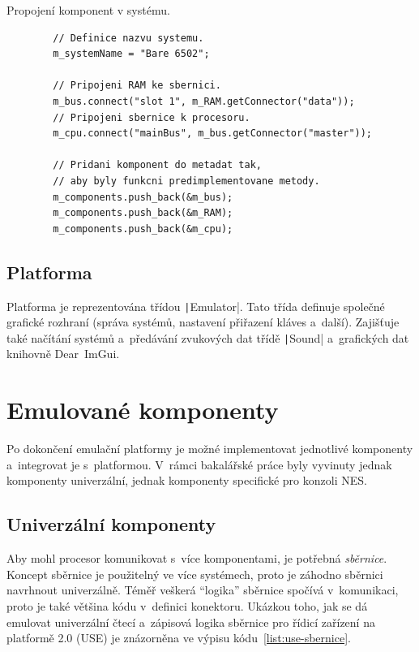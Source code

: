 \begin{listing}
	\caption{Propojení komponent v systému.}
	\label{list:use-propojeni}
	\begin{verbatim}
		// Definice nazvu systemu.
		m_systemName = "Bare 6502";
		
		// Pripojeni RAM ke sbernici.
		m_bus.connect("slot 1", m_RAM.getConnector("data"));
		// Pripojeni sbernice k procesoru.
		m_cpu.connect("mainBus", m_bus.getConnector("master"));
		
		// Pridani komponent do metadat tak, 
		// aby byly funkcni predimplementovane metody.
		m_components.push_back(&m_bus);
		m_components.push_back(&m_RAM);
		m_components.push_back(&m_cpu);
	\end{verbatim}
\end{listing}

\subsection{Platforma}
Platforma je reprezentována třídou \texttt|Emulator|. Tato třída definuje společné grafické rozhraní (správa systémů, nastavení přiřazení kláves a~další). Zajišťuje také načítání systémů a~předávání zvukových dat třídě \texttt|Sound| a~grafických dat knihovně Dear~ImGui.

\section{Emulované komponenty}
Po dokončení emulační platformy je možné implementovat jednotlivé komponenty a~integrovat je s~platformou. V~rámci bakalářské práce byly vyvinuty jednak komponenty univerzální, jednak komponenty specifické pro konzoli NES.

\subsection{Univerzální komponenty}
Aby mohl procesor komunikovat s~více komponentami, je potřebná \emph{sběrnice}. Koncept sběrnice je použitelný ve více systémech, proto je záhodno sběrnici navrhnout univerzálně. Téměř veškerá \enquote{logika} sběrnice spočívá v~komunikaci, proto je také většina kódu v~definici konektoru. Ukázkou toho, jak se dá emulovat univerzální čtecí a~zápisová logika sběrnice pro řídicí zařízení na platformě 2.0 (USE) je znázorněna ve výpisu kódu~\ref{list:use-sbernice}.

